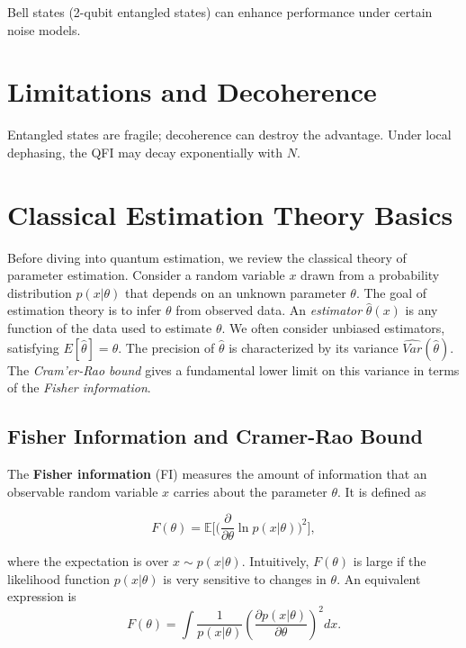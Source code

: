 Bell states (2-qubit entangled states) can enhance performance under
certain noise models.

\section{Limitations and Decoherence}

Entangled states are fragile; decoherence can destroy the
advantage. Under local dephasing, the QFI may decay exponentially with
$N$.




\section{Classical Estimation Theory Basics}

\label{sec:classical}



Before diving into quantum estimation, we review the classical theory
of parameter estimation. Consider a random variable $x$ drawn from a
probability distribution $p(x|\theta)$ that depends on an unknown
parameter $\theta$. The goal of estimation theory is to infer $\theta$
from observed data. An \textit{estimator} $\hat{\theta}(x)$ is any
function of the data used to estimate $\theta$. We often consider
unbiased estimators, satisfying $E[\hat{\theta}] = \theta$. The
precision of $\hat{\theta}$ is characterized by its variance
$\widehat{Var}(\hat{\theta})$. The \textit{Cram'er-Rao bound} gives a
fundamental lower limit on this variance in terms of the
\textit{Fisher information}.



\subsection{Fisher Information and Cramer-Rao Bound}



The \textbf{Fisher information} (FI) measures the amount of
information that an observable random variable $x$ carries about the
parameter $\theta$. It is defined as

\begin{equation}
F(\theta)=\mathbb{E}\Bigg[\Big(\frac{\partial}{\partial \theta}\ln p(x|\theta)\Big)^2\Bigg],
\label{eq:FI-def}
\end{equation}

where the expectation is over $x\sim p(x|\theta)$. Intuitively,
$F(\theta)$ is large if the likelihood function $p(x|\theta)$ is very
sensitive to changes in $\theta$. An equivalent expression is
\[
F(\theta)=\int \frac{1}{p(x|\theta)}\left(\frac{\partial p(x|\theta)}{\partial \theta}\right)^2 dx.
\]


